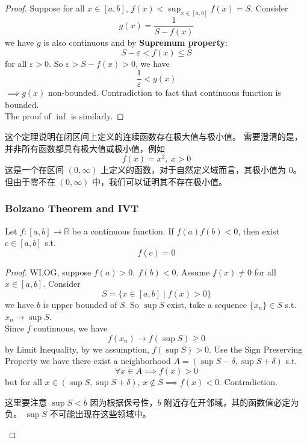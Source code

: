 \documentclass[
	UTF-8,
	11pt, %
	a4paper, %
]{LegrandOrangeBook}
\begin{document}
    \begin{proof}
        Suppose for all $x \in [a,b]$, $f(x) < \sup_{x \in [a,b]} f(x) =S$. Consider
        $$
            g(x) = \dfrac{1}{S - f(x)}
        $$
        we have $g$ is also continuous and by \textbf{Supremum property}:
        $$
        S-\varepsilon < f(x) \leq S
        $$
        for all $\varepsilon >0$. So $\varepsilon > S-f(x) > 0$, we have 
        $$
        \dfrac{1}{\varepsilon} < g(x)
        $$
        $\implies g(x)$ non-bounded. Contradiction to 
        fact that continuous function is bounded. \\

        The proof of $\inf$ is similarly.
    \end{proof}

    \begin{remark}
        这个定理说明在闭区间上定义的连续函数存在极大值与极小值。
        需要澄清的是，并非所有函数都具有极大值或极小值，例如 
        $$
            f(x)=x^2,\ x>0
        $$
        这是一个在区间 $(0,\infty)$ 上定义的函数，对于自然定义域而言，其极小值为 $0$。
        但由于零不在 $(0,\infty)$ 中，我们可以证明其不存在极小值。
    \end{remark}

    \newpage

    \subsubsection{Bolzano Theorem and IVT}

    \begin{lemma}
        Let $f : [a, b] \to \mathbb{R}$ be a continuous function. If $f(a)f(b)<0$, then
        exist $c \in [a,b]$ s.t. $$f(c) = 0$$
    \end{lemma}

    \begin{proof}
        WLOG, suppose $f(a)>0,\ f(b)<0$. Assume $f(x) \neq 0$ for all $x \in [a,b]$.
        Consider 
        $$
            S = \{ x \in [a,b] \mid f(x)>0 \}
        $$
        we have $b$ is upper bounded of $S$. So $\sup S$ exist, 
        take a sequence $\{x_n\} \in S$ s.t. $x_n \to \sup S$. \\
        
        Since $f$ continuous, we have
        $$f(x_{n}) \to f(\sup S) \geq 0$$ 
        by Limit Inequality, by we assumption, $f(\sup S)>0$. 
        Use the Sign Preserving Property we have 
        there exist a neighborhood $A = (\sup S - \delta, \sup S + \delta)$ s.t.
        $$
            \forall x \in A \implies f(x)>0
        $$
        but for all $x \in (\sup S, \sup S + \delta)$, $x \notin S \implies f(x)<0$.
        Contradiction.
        \begin{remark}
            这里要注意 $\sup S< b$ 因为根据保号性，$b$ 附近存在开邻域，其的函数值必定为负。
            $\sup S$ 不可能出现在这些领域中。
        \end{remark}
    \end{proof}
\end{document}

